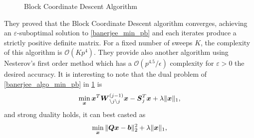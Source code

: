 \begin{figure}
\begin{center}
   \caption{Block Coordinate Descent Algorithm}
   \label{fig:banerjee_block_algo}

\end{center}
\end{figure}
They proved that the Block Coordinate Descent algorithm converges, achieving an $\varepsilon$-suboptimal solution to \cref{banerjee_min_pb} and each iterates produce a strictly positive definite matrix. For a fixed number of sweeps $K$, the complexity of this algorithm is $\mathcal O (Kp^4)$. They provide also another algorithm using Nesterov's first order method which has a $\mathcal O(p^{4.5}/\epsilon)$ complexity for $\varepsilon > 0$ the desired accuracy. It is interesting to note that the dual problem of \cref{banerjee_algo_min_pb} in \cref{fig:banerjee_block_algo} is 
\begin{equation}
  \min_{\boldsymbol x} \boldsymbol x^T\boldsymbol W_{\setminus j \setminus j}^{(j-1)}\boldsymbol x - \boldsymbol S_j^T\boldsymbol x + \lambda\|\boldsymbol x\|_1,
\end{equation}
and strong duality holds, it can best casted as
\begin{equation}
\label{banerjee_dual_lasso}
  \min_{\boldsymbol x} \|\boldsymbol Q\boldsymbol x - \boldsymbol b\|_2^2 + \lambda\|\boldsymbol x\|_1,
\end{equation}
